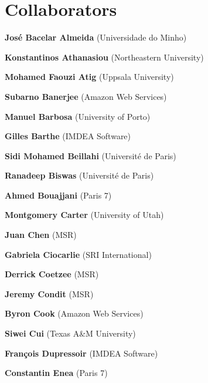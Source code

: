 \documentclass{article}
\begin{document}
  \section*{Collaborators}

  \begin{commalist}

    \item {\bf José Bacelar Almeida} (Universidade do Minho)


    \item {\bf Konstantinos Athanasiou} (Northeastern University)


    \item {\bf Mohamed Faouzi Atig} (Uppsala University)


    \item {\bf Subarno Banerjee} (Amazon Web Services)


    \item {\bf Manuel Barbosa} (University of Porto)


    \item {\bf Gilles Barthe} (IMDEA Software)


    \item {\bf Sidi Mohamed Beillahi} (Université de Paris)


    \item {\bf Ranadeep Biswas} (Université de Paris)


    \item {\bf Ahmed Bouajjani} (Paris 7)


    \item {\bf Montgomery Carter} (University of Utah)


    \item {\bf Juan Chen} (MSR)


    \item {\bf Gabriela Ciocarlie} (SRI International)


    \item {\bf Derrick Coetzee} (MSR)


    \item {\bf Jeremy Condit} (MSR)


    \item {\bf Byron Cook} (Amazon Web Services)


    \item {\bf Siwei Cui} (Texas A&M University)


    \item {\bf François Dupressoir} (IMDEA Software)


    \item {\bf Constantin Enea} (Paris 7)



\end{commalist}
\end{document}

